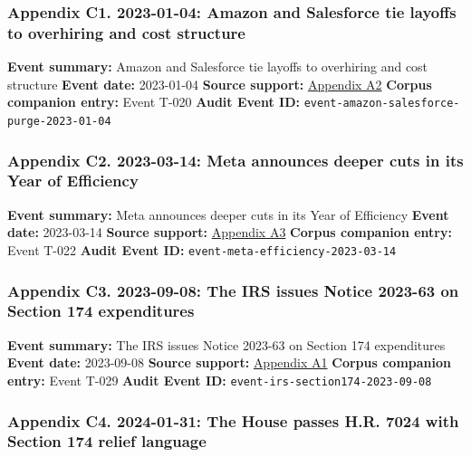 \documentclass[
  american,
  11pt,
  letterpaper,
]{article}
\begin{document}
\subsubsection{Appendix C1. 2023-01-04: Amazon and Salesforce tie
layoffs to overhiring and cost
structure}\label{appendix-c1-2023-01-04-amazon-and-salesforce-tie-layoffs-to-overhiring-and-cost-structure}

\textbf{Event summary:} Amazon and Salesforce tie layoffs to overhiring
and cost structure \textbf{Event date:} 2023-01-04 \textbf{Source
support:}
\hyperref[appendix-a2-amazon-salesforce-jettison-jobs-in-latest-tech-worker-purge]{Appendix
A2} \textbf{Corpus companion entry:} Event T-020 \textbf{Audit Event
ID:} \texttt{event-amazon-salesforce-purge-2023-01-04}

\subsubsection{Appendix C2. 2023-03-14: Meta announces deeper cuts in
its Year of
Efficiency}\label{appendix-c2-2023-03-14-meta-announces-deeper-cuts-in-its-year-of-efficiency}

\textbf{Event summary:} Meta announces deeper cuts in its Year of
Efficiency \textbf{Event date:} 2023-03-14 \textbf{Source support:}
\hyperref[appendix-a3-mark-zuckerberg-s-message-to-meta-employees]{Appendix
A3} \textbf{Corpus companion entry:} Event T-022 \textbf{Audit Event
ID:} \texttt{event-meta-efficiency-2023-03-14}

\subsubsection{Appendix C3. 2023-09-08: The IRS issues Notice 2023-63 on
Section 174
expenditures}\label{appendix-c3-2023-09-08-the-irs-issues-notice-2023-63-on-section-174-expenditures}

\textbf{Event summary:} The IRS issues Notice 2023-63 on Section 174
expenditures \textbf{Event date:} 2023-09-08 \textbf{Source support:}
\hyperref[appendix-a1-notice-2023-63-guidance-on-section-174-and-specified-research-or-experimental-expenditures]{Appendix
A1} \textbf{Corpus companion entry:} Event T-029 \textbf{Audit Event
ID:} \texttt{event-irs-section174-2023-09-08}

\subsubsection{Appendix C4. 2024-01-31: The House passes H.R. 7024 with
Section 174 relief
language}\label{appendix-c4-2024-01-31-the-house-passes-h-r-7024-with-section-174-relief-language}
\end{document}
